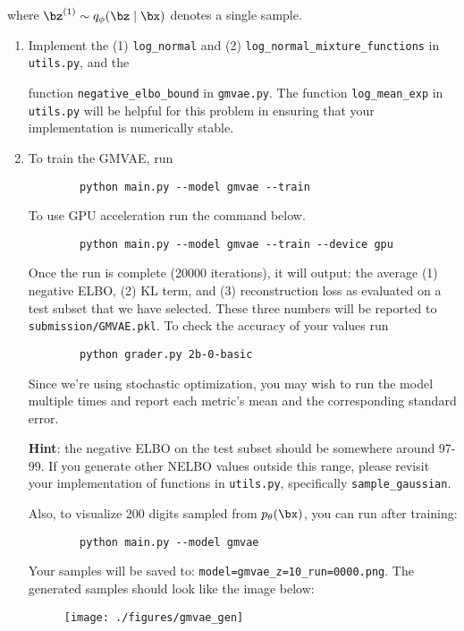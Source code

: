 where $\bz^{(1)} \sim q_{\phi}(\bz \mid \bx)$ denotes a single sample.

\begin{enumerate}[label=(\alph*)]
    \item {} Implement the (1) \texttt{log\_normal} and (2) \texttt{log\_normal\_mixture\_functions} in \texttt{utils.py}, and the 

    function \texttt{negative\_elbo\_bound} in \texttt{gmvae.py}. The function \texttt{log\_mean\_exp} in \texttt{utils.py} 
    will be helpful for this problem in ensuring that your implementation is numerically stable.

    \clearpage

    \item {} To train the GMVAE, run 
    \begin{verbatim}
        python main.py --model gmvae --train
    \end{verbatim}
    
    To use GPU acceleration run the command below.
    \begin{verbatim}
        python main.py --model gmvae --train --device gpu
    \end{verbatim}
    
    Once the run is complete (20000 iterations), it will output: the average (1) negative ELBO, (2) KL term, and (3) reconstruction loss as 
    evaluated on a test subset that we have selected. These three numbers will be reported to \texttt{submission/GMVAE.pkl}. To check the accuracy 
    of your values run

    \begin{verbatim}
        python grader.py 2b-0-basic
    \end{verbatim}
    
    Since we’re using stochastic optimization, you may wish to run the model multiple times and report each metric’s mean
    and the corresponding standard error. 
    
    \textbf{Hint}: the negative ELBO on the test subset should be somewhere around 97-99. If you generate other NELBO values outside this range, please
    revisit your implementation of functions in \texttt{utils.py}, specifically \texttt{sample\_gaussian}.

    Also, to visualize 200 digits sampled from $p_{\theta}(\bx)$, you can run after training: 
    \begin{verbatim}
        python main.py --model gmvae
    \end{verbatim}
    
    Your samples will be saved to: \texttt{model=gmvae\_z=10\_run=0000.png}. The generated samples should look like the image below:

    \begin{figure}[h]
        \centering
        \texttt{[image: ./figures/gmvae\_gen]}
    \end{figure}

\end{enumerate}